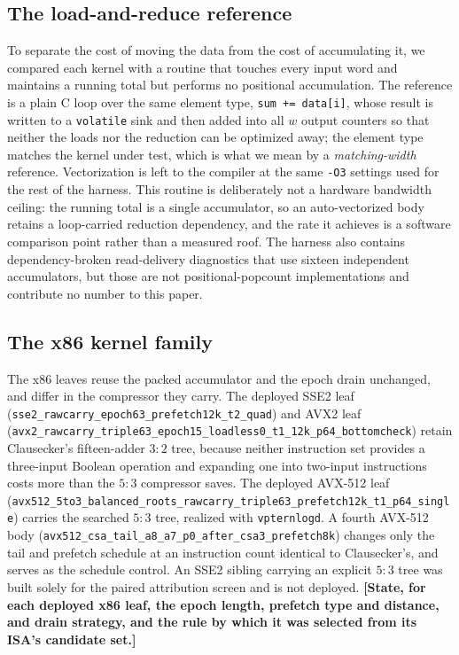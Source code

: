 \documentclass[fleqn,10pt]{wlscirep}
\begin{document}
\subsection*{The load-and-reduce reference}
To separate the cost of moving the data from the cost of accumulating it, we compared each kernel with a routine that touches every input word and maintains a running total but performs no positional accumulation. The reference is a plain C loop over the same element type, \texttt{sum += data[i]}, whose result is written to a \texttt{volatile} sink and then added into all $w$ output counters so that neither the loads nor the reduction can be optimized away; the element type matches the kernel under test, which is what we mean by a \emph{matching-width} reference. Vectorization is left to the compiler at the same \texttt{-O3} settings used for the rest of the harness. This routine is deliberately not a hardware bandwidth ceiling: the running total is a single accumulator, so an auto-vectorized body retains a loop-carried reduction dependency, and the rate it achieves is a software comparison point rather than a measured roof. The harness also contains dependency-broken read-delivery diagnostics that use sixteen independent accumulators, but those are not positional-popcount implementations and contribute no number to this paper.

\subsection*{The x86 kernel family}
The x86 leaves reuse the packed accumulator and the epoch drain unchanged, and differ in the compressor they carry. The deployed SSE2 leaf (\texttt{sse2\_rawcarry\_epoch63\_prefetch12k\_t2\_quad}) and AVX2 leaf (\texttt{avx2\_rawcarry\_triple63\_epoch15\_loadless0\_t1\_12k\_p64\_bottomcheck}) retain Clausecker's fifteen-adder $3{:}2$ tree, because neither instruction set provides a three-input Boolean operation and expanding one into two-input instructions costs more than the $5{:}3$ compressor saves. The deployed AVX-512 leaf (\texttt{avx512\_5to3\_balanced\_roots\_rawcarry\_triple63\_prefetch12k\_t1\_p64\_single}) carries the searched $5{:}3$ tree, realized with \texttt{vpternlogd}. A fourth AVX-512 body (\texttt{avx512\_csa\_tail\_a8\_a7\_p0\_after\_csa3\_prefetch8k}) changes only the tail and prefetch schedule at an instruction count identical to Clausecker's, and serves as the schedule control. An SSE2 sibling carrying an explicit $5{:}3$ tree was built solely for the paired attribution screen and is not deployed. \textbf{[State, for each deployed x86 leaf, the epoch length, prefetch type and distance, and drain strategy, and the rule by which it was selected from its ISA's candidate set.]}
\end{document}

